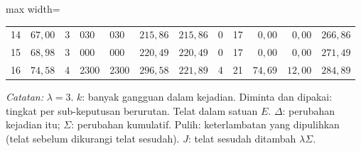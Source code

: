 \begin{table}[htbp]
\begin{adjustbox}{max width=\textwidth}
\begin{tabular}{rrcllrrrrrrr}
14 & $67{,}00$ & 3 & 030 & 030 & $215{,}86$ & $215{,}86$ & 0 & 17 & $0{,}00$ & $0{,}00$ & $266{,}86$ \\
15 & $68{,}98$ & 3 & 000 & 000 & $220{,}49$ & $220{,}49$ & 0 & 17 & $0{,}00$ & $0{,}00$ & $271{,}49$ \\
16 & $74{,}58$ & 4 & 2300 & 2300 & $296{,}58$ & $221{,}89$ & 4 & 21 & $74{,}69$ & $12{,}00$ & $284{,}89$ \\
\bottomrule
\end{tabular}
\end{adjustbox}
\par\smallskip\footnotesize\textit{Catatan:} $\lambda = 3$. $k$: banyak gangguan dalam kejadian. Diminta dan dipakai: tingkat per sub-keputusan berurutan. Telat dalam satuan $E$. $\Delta$: perubahan kejadian itu; $\Sigma$: perubahan kumulatif. Pulih: keterlambatan yang dipulihkan (telat sebelum dikurangi telat sesudah). $J$: telat sesudah ditambah $\lambda\Sigma$.
\end{table}
